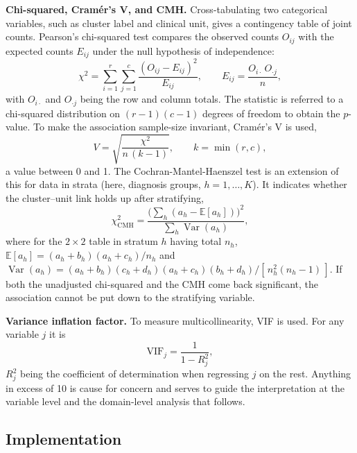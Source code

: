 \noindent \textbf{Chi-squared, Cram\'{e}r's V, and CMH.} Cross-tabulating two categorical variables, such as cluster label and clinical unit, gives a contingency table of joint counts. Pearson's chi-squared test compares the observed counts $O_{ij}$ with the expected counts $E_{ij}$ under the null hypothesis of independence:
\begin{equation}\label{eq:chi2}
\chi^2=\sum_{i=1}^{r}\sum_{j=1}^{c}\frac{(O_{ij}-E_{ij})^2}{E_{ij}},\qquad E_{ij}=\frac{O_{i\cdot}\,O_{\cdot j}}{n},
\end{equation}
with $O_{i\cdot}$ and $O_{\cdot j}$ being the row and column totals. The statistic is referred to a chi-squared distribution on $(r-1)(c-1)$ degrees of freedom to obtain the $p$-value. To make the association sample-size invariant, Cram\'{e}r's V is used,
\begin{equation}\label{eq:cramersv}
V=\sqrt{\frac{\chi^2}{n\,(k-1)}},\qquad k=\min(r,c),
\end{equation}
a value between 0 and 1. The Cochran-Mantel-Haenszel test is an extension of this for data in strata (here, diagnosis groups, $h=1,\dots,K$). It indicates whether the cluster--unit link holds up after stratifying,
\begin{equation}\label{eq:cmh}
\chi^2_{\mathrm{CMH}}=\frac{\bigl(\sum_{h}(a_h-\mathbb{E}[a_h])\bigr)^2}{\sum_{h}\operatorname{Var}(a_h)},
\end{equation}
where for the $2\times2$ table in stratum $h$ having total $n_h$, $\mathbb{E}[a_h]=(a_h+b_h)(a_h+c_h)/n_h$ and $\operatorname{Var}(a_h)=(a_h+b_h)(c_h+d_h)(a_h+c_h)(b_h+d_h)/[\,n_h^2(n_h-1)\,]$. If both the unadjusted chi-squared and the CMH come back significant, the association cannot be put down to the stratifying variable.

\noindent \textbf{Variance inflation factor.} To measure multicollinearity, VIF is used. For any variable $j$ it is
\begin{equation}\label{eq:vif}
\mathrm{VIF}_j=\frac{1}{1-R_j^2},
\end{equation}
$R_j^2$ being the coefficient of determination when regressing $j$ on the rest. Anything in excess of 10 is cause for concern and serves to guide the interpretation at the variable level and the domain-level analysis that follows.

\subsection{Implementation}

